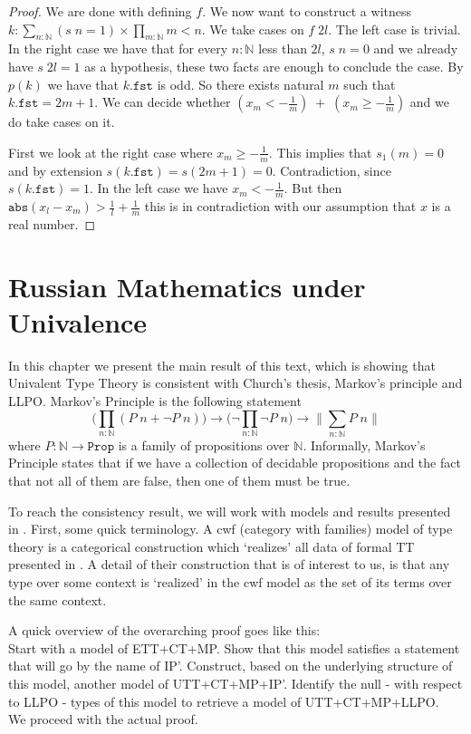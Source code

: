 \documentclass[12pt]{report}
\theoremstyle{definition}
\begin{document}
\begin{proof}
We are done with defining $f$. 
We now want to construct a witness $k : \sum_{n : \mathbb{N}}(s\;n = 1)\times \prod_{m : \mathbb{N}}m < n$. 
We take cases on $f\; 2l$. 
The left case is trivial. 
In the right case we have that for every $n :\mathbb{N}$ less than $2l$, $s\;n = 0$ and we already have $s\;2l = 1$ as a hypothesis, these two facts are enough to conclude the case. 
By $p(k)$ we have that $k.\mathtt{fst}$ is odd. 
So there exists natural $m$ such that $k.\mathtt{fst} = 2m+1$. 
We can decide whether $(x_m < -\frac{1}{m})\;+\;(x_m \geq -\frac{1}{m})$ and we do take cases on it. 

First we look at the right case where $x_m \geq -\frac{1}{m}$. 
This implies that $s_1(m) = 0$ and by extension $s(k.\mathtt{fst}) = s(2m+1) = 0$. 
Contradiction, since $s(k.\mathtt{fst}) = 1$. 
In the left case we have $x_m < -\frac{1}{m}$. 
But then $\mathtt{abs}(x_l-x_m) > \frac{1}{l} + \frac{1}{m}$ this is in contradiction with our assumption that $x$ is a real number. 
\end{proof}

\chapter{Russian Mathematics under Univalence}\label{RUSS}
In this chapter we present the main result of this text, which is showing that Univalent Type Theory is consistent with Church's thesis, Markov's principle and LLPO. 
Markov's Principle is the following statement
$$\Big(\prod_{n : \mathbb{N}}(P\; n + \neg P\; n)\Big) \rightarrow  \Big(\neg \prod_{n : \mathbb{N}}\neg P\; n\Big)\rightarrow \Big\lVert \sum_{n : \mathbb{N}} P\; n \Big\rVert$$
where $P : \mathbb{N} \rightarrow \mathtt{Prop}$ is a family of propositions over $\mathbb{N}$. 
Informally, Markov's Principle states that if we have a collection of decidable propositions and the fact that not all of them are false, then one of them must be true. 

To reach the consistency result, we will work with models and results presented in \cite{1905.03014}. 
First, some quick terminology. 
A cwf (category with families) model of type theory is a categorical construction which `realizes' all data of formal TT presented in . 
A detail of their construction that is of interest to us, is that any type over some context is `realized' in the cwf model as the set of its terms over the same context. 

A quick overview of the overarching proof goes like this:\\
Start with a model of ETT+CT+MP. 
Show that this model satisfies a statement that will go by the name of IP'. 
Construct, based on the underlying structure of this model, another model of UTT+CT+MP+IP'. 
Identify the null - with respect to LLPO - types of this model to retrieve a model of UTT+CT+MP+LLPO.\\
We proceed with the actual proof. 
\end{document}

